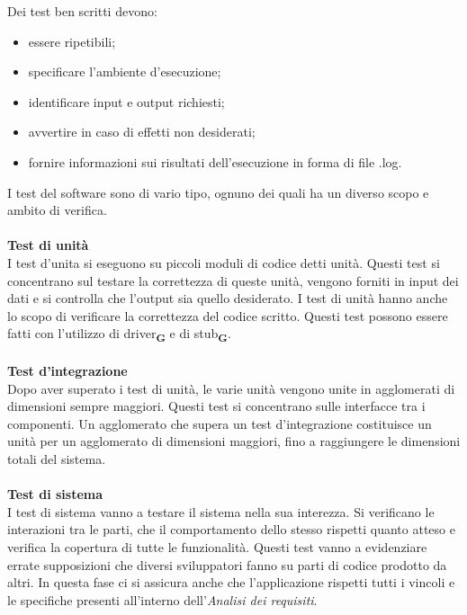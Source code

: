             Dei test ben scritti devono:
            \begin{itemize}
                \item essere ripetibili;
                \item specificare l'ambiente d'esecuzione;
                \item identificare input e output richiesti;
                \item avvertire in caso di effetti non desiderati;
                \item fornire informazioni sui risultati dell'esecuzione in forma di file {\selectfont .log}.
            \end{itemize}
            I test del software sono di vario tipo, ognuno dei quali ha un diverso scopo e ambito di verifica.\\
            \\
            \textbf{Test di unità}\\
            I test d'unita si eseguono su piccoli moduli di codice detti unità. Questi test si concentrano sul testare la correttezza di queste unità, vengono forniti in input dei dati e si controlla che l'output sia quello desiderato. I test di unità hanno anche lo scopo di verificare la correttezza del codice scritto. Questi test possono essere fatti con l'utilizzo di driver\textsubscript{\textbf{G}} e di stub\textsubscript{\textbf{G}}.\\
            \\
            \textbf{Test d'integrazione}\\
            Dopo aver superato i test di unità, le varie unità vengono unite in agglomerati di dimensioni sempre maggiori. Questi test si concentrano sulle interfacce tra i componenti. Un agglomerato che supera un test d'integrazione costituisce un unità per un agglomerato di dimensioni maggiori, fino a raggiungere le dimensioni totali del sistema.\\
            \\
            \textbf{Test di sistema}\\
            I test di sistema vanno a testare il sistema nella sua interezza. Si verificano le interazioni tra le parti, che il comportamento dello stesso rispetti quanto atteso e verifica la copertura di tutte le funzionalità. Questi test vanno a evidenziare errate supposizioni che diversi sviluppatori fanno su parti di codice prodotto da altri.
            In questa fase ci si assicura anche che l'applicazione rispetti tutti i vincoli e le specifiche presenti all'interno dell'\textit{Analisi dei requisiti}.\\
